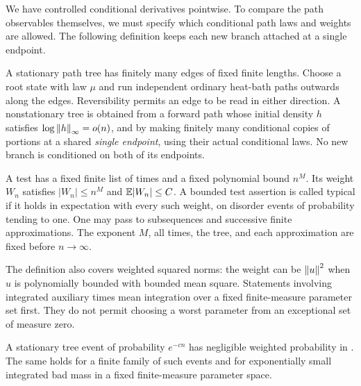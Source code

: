 We have controlled conditional derivatives pointwise.  To compare the
path observables themselves, we must specify which conditional path
laws and weights are allowed.  The following definition keeps each
new branch attached at a single endpoint.

\begin{definition}
\label{def:path-tree}
A stationary path tree has finitely many edges of fixed finite lengths.
Choose a root state with law $\mu$ and run independent ordinary
heat-bath paths outwards along the edges.  Reversibility permits an
edge to be read in either direction.  A nonstationary tree is obtained
from a forward path whose initial density $h$ satisfies
$\log\left\lVert h\right\rVert_\infty=o(n)$, and by making finitely many conditional
copies of portions at a shared \emph{single endpoint}, using their
actual conditional laws.  No new branch is conditioned on both of its
endpoints.

A test has a fixed finite list of times and a fixed polynomial bound
$n^M$.  Its weight $W_n$ satisfies $|W_n|\le n^M$ and
$\mathbb E|W_n|\le C$.  A bounded test assertion is called typical if it holds
in expectation with every such weight, on disorder events of probability
tending to one.  One may pass to subsequences and successive finite
approximations.  The exponent $M$, all times, the tree, and each
approximation are fixed before $n\to\infty$.
\end{definition}

The definition also covers weighted squared norms: the weight can be
$\left\lVert u\right\rVert^2$ when $u$ is polynomially bounded with bounded mean square.
Statements involving integrated auxiliary times mean integration over a
fixed finite-measure parameter set first.  They do not permit choosing
a worst parameter from an exceptional set of measure zero.

\begin{lemma}
\label{lem:path-tree-transfer}
A stationary tree event of probability $e^{-cn}$ has negligible weighted
probability in .  The same holds for a finite family
of such events and for exponentially small integrated bad mass in a
fixed finite-measure parameter space.
\end{lemma}

